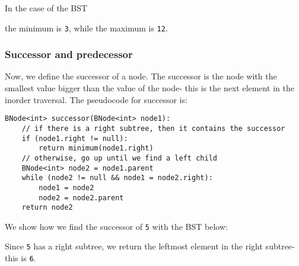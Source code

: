 \documentclass[a4paper, openany]{memoir}
\begin{document}
\noindent In the case of the BST
\begin{center}
\end{center}
the minimum is \texttt{3}, while the maximum is \texttt{12}.

\subsubsection{Successor and predecessor}
Now, we define the successor of a node. The successor is the node with the smallest value bigger than the value of the node- this is the next element in the inorder traversal. The pseudocode for successor is:
\begin{lstlisting}[language=pseudocode]
BNode<int> successor(BNode<int> node1):
    // if there is a right subtree, then it contains the successor
    if (node1.right != null):
        return minimum(node1.right)
    // otherwise, go up until we find a left child
    BNode<int> node2 = node1.parent
    while (node2 != null && node1 = node2.right):
        node1 = node2
        node2 = node2.parent
    return node2
\end{lstlisting}
We show how we find the successor of \texttt{5} with the BST below:
\begin{center}
\end{center}
Since \texttt{5} has a right subtree, we return the leftmost element in the right subtree- this is \texttt{6}. 
\end{document}
